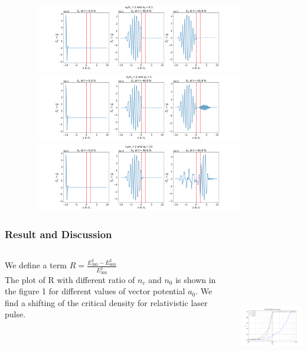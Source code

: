 \documentclass{beamer}
\begin{document}
\begin{frame}
    \includegraphics[width=12cm, height=3cm]{p1.png}
    \includegraphics[width=12cm, height=3cm]{p2.png}
    \includegraphics[width=12cm, height=3cm]{p3.png}
\end{frame}
\begin{frame}
    \frametitle{Result and Discussion}
    \small
    \begin{columns}
        \begin{column}{0.3\textwidth}
            We define a term
            $
                R= \frac{{E_{300}^2}-{E_{600}^2}}{{E_{300}^2}}
            $\\
            The plot of R with different ratio of $n_c$ and $n_0$ is shown in the figure 1 for different values of vector potential $a_0$. We find a shifting of the critical density for relativistic laser pulse.
        \end{column}
        \begin{column}{0.7\textwidth}
            \includegraphics[width=8cm, height=6cm]{reflection.png}
        \end{column}
    \end{columns}
\end{frame}
\end{document}
